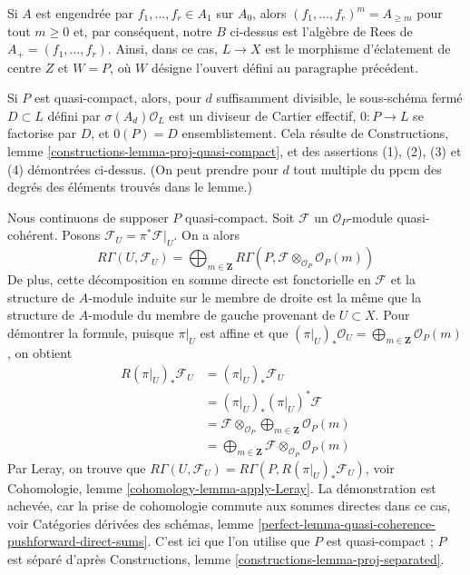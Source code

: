 \medskip\noindent
Si $A$ est engendrée par $f_1, \ldots, f_r \in A_1$ sur $A_0$, alors
$(f_1, \ldots, f_r)^m = A_{\geq m}$ pour tout $m \geq 0$ et, par conséquent, notre
$B$ ci-dessus est l'algèbre de Rees de $A_+ = (f_1, \ldots, f_r)$. Ainsi, dans ce
cas, $L \to X$ est le morphisme d'éclatement de centre $Z$ et $W = P$, où $W$ désigne l'ouvert défini au
paragraphe précédent.

\medskip\noindent
Si $P$ est quasi-compact, alors, pour $d$ suffisamment divisible, le
sous-schéma fermé $D \subset L$ défini par $\sigma(A_d)\mathcal{O}_L$
est un diviseur de Cartier effectif, $0 : P \to L$ se factorise par $D$,
et $0(P) = D$ ensemblistement. Cela résulte de
Constructions, lemme \ref{constructions-lemma-proj-quasi-compact},
et des assertions (1), (2), (3) et (4) démontrées ci-dessus. (On peut prendre pour $d$ tout multiple du
ppcm des degrés des éléments trouvés dans le lemme.)

\medskip\noindent
Nous continuons de supposer $P$ quasi-compact.
Soit $\mathcal{F}$ un $\mathcal{O}_P$-module quasi-cohérent.
Posons $\mathcal{F}_U = \pi^*\mathcal{F}|_U$. On a alors
\begin{equation}
\label{equation-cohomology-torsor}
R\Gamma(U, \mathcal{F}_U) =
\bigoplus\nolimits_{m \in \mathbf{Z}}
R\Gamma(P, \mathcal{F} \otimes_{\mathcal{O}_P} \mathcal{O}_P(m))
\end{equation}
De plus, cette décomposition en somme directe est fonctorielle en $\mathcal{F}$
et la structure de $A$-module induite sur le membre de droite est la même que la
structure de $A$-module du membre de gauche provenant de $U \subset X$.
Pour démontrer la formule, puisque $\pi|_U$ est affine et que
$(\pi|_U)_*\mathcal{O}_U = \bigoplus_{m \in \mathbf{Z}} \mathcal{O}_P(m)$,
on obtient
\begin{align*}
R(\pi|_U)_*\mathcal{F}_U
& =
(\pi|_U)_*\mathcal{F}_U \\
& =
(\pi|_U)_*(\pi|_U)^*\mathcal{F} \\
& =
\mathcal{F} \otimes_{\mathcal{O}_P} 
\bigoplus\nolimits_{m \in \mathbf{Z}} \mathcal{O}_P(m) \\
& =
\bigoplus\nolimits_{m \in \mathbf{Z}}
\mathcal{F} \otimes_{\mathcal{O}_P} \mathcal{O}_P(m)
\end{align*}
Par Leray, on trouve que
$R\Gamma(U, \mathcal{F}_U) =
R\Gamma(P, R(\pi|_U)_*\mathcal{F}_U)$, voir
Cohomologie, lemme \ref{cohomology-lemma-apply-Leray}.
La démonstration est achevée, car la prise de cohomologie commute aux
sommes directes dans ce cas, voir Catégories dérivées des schémas, lemme
\ref{perfect-lemma-quasi-coherence-pushforward-direct-sums}.
C'est ici que l'on utilise que $P$ est quasi-compact ; $P$ est séparé
d'après Constructions, lemme \ref{constructions-lemma-proj-separated}.

